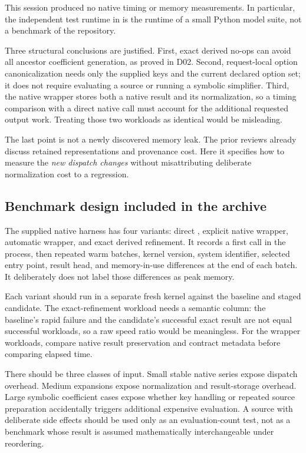 \documentclass[11pt,letterpaper]{article}
\newcommand{\code}[1]{\texttt{\detokenize{#1}}}
\begin{document}
This session produced no native timing or memory measurements. In particular, the independent test runtime in \code{independent_checks.txt} is the runtime of a small Python model suite, not a benchmark of the repository.

Three structural conclusions are justified. First, exact derived no-ops can avoid all ancestor coefficient generation, as proved in D02. Second, request-local option canonicalization needs only the supplied keys and the current declared option set; it does not require evaluating a source or running a symbolic simplifier. Third, the native wrapper stores both a native result and its normalization, so a timing comparison with a direct native call must account for the additional requested output work. Treating those two workloads as identical would be misleading.

The last point is not a newly discovered memory leak. The prior reviews already discuss retained representations and provenance cost. Here it specifies how to measure the \emph{new dispatch changes} without misattributing deliberate normalization cost to a regression.

\subsection{Benchmark design included in the archive}

The supplied native harness has four variants: direct \code{Series}, explicit native wrapper, automatic wrapper, and exact derived refinement. It records a first call in the process, then repeated warm batches, kernel version, system identifier, selected entry point, result head, and memory-in-use differences at the end of each batch. It deliberately does not label those differences as peak memory.

Each variant should run in a separate fresh kernel against the baseline and staged candidate. The exact-refinement workload needs a semantic column: the baseline's rapid failure and the candidate's successful exact result are not equal successful workloads, so a raw speed ratio would be meaningless. For the wrapper workloads, compare native result preservation and contract metadata before comparing elapsed time.

There should be three classes of input. Small stable native series expose dispatch overhead. Medium expansions expose normalization and result-storage overhead. Large symbolic coefficient cases expose whether key handling or repeated source preparation accidentally triggers additional expensive evaluation. A source with deliberate side effects should be used only as an evaluation-count test, not as a benchmark whose result is assumed mathematically interchangeable under reordering.
\end{document}
